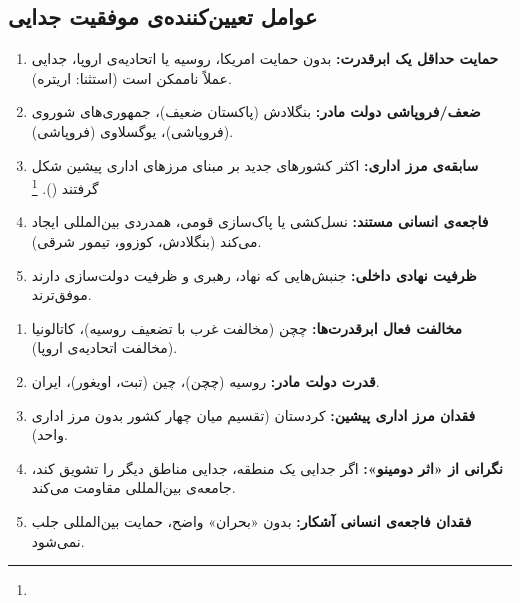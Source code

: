 \subsection{عوامل تعیین‌کننده‌ی موفقیت جدایی}
\label{subsec:ch09-factors}

\begin{tcolorbox}[successbox, title={شرایطی که جدایی را ممکن می‌سازد}]
\begin{enumerate}[nosep, label=\textbf{\arabic*.}]
  \item \textbf{حمایت حداقل یک ابرقدرت:} بدون حمایت امریکا، روسیه یا اتحادیه‌ی اروپا، جدایی عملاً ناممکن است (استثنا: اریتره).
  \item \textbf{ضعف/فروپاشی دولت مادر:} بنگلادش (پاکستان ضعیف)، جمهوری‌های شوروی (فروپاشی)، یوگسلاوی (فروپاشی).
  \item \textbf{سابقه‌ی مرز اداری:} اکثر کشورهای جدید بر مبنای مرزهای اداری پیشین شکل گرفتند ().%
  \footnote{}
  \item \textbf{فاجعه‌ی انسانی مستند:} نسل‌کشی یا پاک‌سازی قومی، همدردی بین‌المللی ایجاد می‌کند (بنگلادش، کوزوو، تیمور شرقی).
  \item \textbf{ظرفیت نهادی داخلی:} جنبش‌هایی که نهاد، رهبری و ظرفیت دولت‌سازی دارند موفق‌ترند.
\end{enumerate}
\end{tcolorbox}

\begin{tcolorbox}[failbox, title={شرایطی که جدایی را ناممکن می‌سازد}]
\begin{enumerate}[nosep, label=\textbf{\arabic*.}]
  \item \textbf{مخالفت فعال ابرقدرت‌ها:} چچن (مخالفت غرب با تضعیف روسیه)، کاتالونیا (مخالفت اتحادیه‌ی اروپا).
  \item \textbf{قدرت دولت مادر:} روسیه (چچن)، چین (تبت، اویغور)، ایران.
  \item \textbf{فقدان مرز اداری پیشین:} کردستان (تقسیم میان چهار کشور بدون مرز اداری واحد).
  \item \textbf{نگرانی از «اثر دومینو»:} اگر جدایی یک منطقه، جدایی مناطق دیگر را تشویق کند، جامعه‌ی بین‌المللی مقاومت می‌کند.
  \item \textbf{فقدان فاجعه‌ی انسانی آشکار:} بدون «بحران» واضح، حمایت بین‌المللی جلب نمی‌شود.
\end{enumerate}
\end{tcolorbox}

